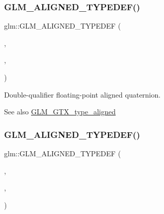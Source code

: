 \subsubsection{\texorpdfstring{G\+L\+M\+\_\+\+A\+L\+I\+G\+N\+E\+D\+\_\+\+T\+Y\+P\+E\+D\+E\+F()}{GLM\_ALIGNED\_TYPEDEF()}\hspace{0.1cm}{\footnotesize\ttfamily [207/209]}}
{\footnotesize\ttfamily glm\+::\+G\+L\+M\+\_\+\+A\+L\+I\+G\+N\+E\+D\+\_\+\+T\+Y\+P\+E\+D\+EF (\begin{DoxyParamCaption}\item[{\mbox{\hyperlink{namespaceglm_a49693161673a003b4a8fd4d8b15b0b7b}{dquat}}}]{,  }\item[{aligned\+\_\+dquat}]{,  }\item[{32}]{ }\end{DoxyParamCaption})}

Double-\/qualifier floating-\/point aligned quaternion. \begin{DoxySeeAlso}{See also}
\mbox{\hyperlink{group__gtx__type__aligned}{G\+L\+M\+\_\+\+G\+T\+X\+\_\+type\+\_\+aligned}} 
\end{DoxySeeAlso}
\mbox{\label{group__gtx__type__aligned_ga1ed8aeb5ca67fade269a46105f1bf273}} 
\subsubsection{\texorpdfstring{G\+L\+M\+\_\+\+A\+L\+I\+G\+N\+E\+D\+\_\+\+T\+Y\+P\+E\+D\+E\+F()}{GLM\_ALIGNED\_TYPEDEF()}\hspace{0.1cm}{\footnotesize\ttfamily [208/209]}}
{\footnotesize\ttfamily glm\+::\+G\+L\+M\+\_\+\+A\+L\+I\+G\+N\+E\+D\+\_\+\+T\+Y\+P\+E\+D\+EF (\begin{DoxyParamCaption}\item[{\mbox{\hyperlink{group__gtc__type__precision_gac59c4d798396552e4bbb866b3d8a2f18}{f32quat}}}]{,  }\item[{aligned\+\_\+f32quat}]{,  }\item[{16}]{ }\end{DoxyParamCaption})}

